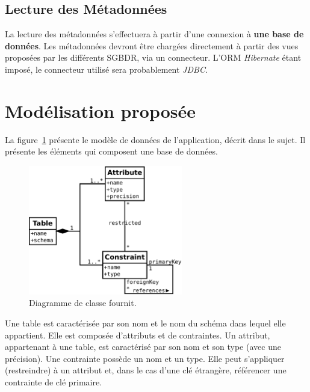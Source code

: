 	\subsection{Lecture des Métadonnées}
	La lecture des métadonnées s'effectuera à partir d'une connexion à \textbf{une base de données}. Les métadonnées devront être chargées directement à partir des vues proposées par les différents SGBDR, via un connecteur. L'ORM \emph{Hibernate} étant imposé, le connecteur utilisé sera probablement \emph{JDBC}.

\section{Modélisation proposée}
\label{section:modelisation_proposee}

La figure~\ref{figure:diag_classe_fournit} présente le modèle de données de l'application, décrit dans le sujet. Il présente les éléments qui composent une base de données.

\begin{figure}[H]
\centering
\includegraphics[width=0.6\textwidth]{files/diag_class_origine}
\caption{Diagramme de classe fournit.}
\label{figure:diag_classe_fournit}
\end{figure}

Une table est caractérisée par son nom et le nom du schéma dans lequel elle appartient. Elle est composée d'attributs et de contraintes. Un attribut, appartenant à une table, est caractérisé par son nom et son type (avec une précision). Une contrainte possède un nom et un type. Elle peut s'appliquer (restreindre) à un attribut et, dans le cas d'une clé étrangère, référencer une contrainte de clé primaire.